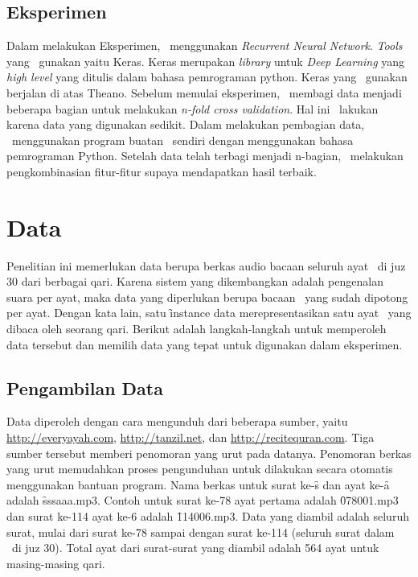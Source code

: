 	\subsection{Eksperimen}
	Dalam melakukan Eksperimen, \saya~menggunakan \textit{Recurrent Neural Network}. \textit{Tools} yang \saya~gunakan yaitu Keras. Keras merupakan \textit{library} untuk \textit{Deep Learning} yang \textit{high level} yang ditulis dalam bahasa pemrograman python. Keras yang \saya~gunakan berjalan di atas Theano.
	Sebelum memulai eksperimen, \saya~membagi data menjadi beberapa bagian untuk melakukan \textit{n-fold cross validation}. Hal ini \saya~lakukan karena data yang digunakan sedikit. Dalam melakukan pembagian data, \saya~menggunakan program buatan \saya~sendiri dengan menggunakan bahasa pemrograman Python.
	Setelah data telah terbagi menjadi n-bagian, \saya~melakukan pengkombinasian fitur-fitur supaya mendapatkan hasil terbaik.
\section{Data}
Penelitian ini memerlukan data berupa berkas audio bacaan seluruh ayat \quran~di juz 30 dari berbagai qari. Karena sistem yang dikembangkan adalah pengenalan suara per ayat, maka data yang diperlukan berupa bacaan \quran~yang sudah dipotong per ayat. Dengan kata lain, satu \f{instance} data merepresentasikan satu ayat \quran~yang dibaca oleh seorang qari. Berikut adalah langkah-langkah untuk memperoleh data tersebut dan memilih data yang tepat untuk digunakan dalam eksperimen.

  \subsection{Pengambilan Data} \label{pengambilan data}
  Data diperoleh dengan cara mengunduh dari beberapa sumber, yaitu \url{http://everyayah.com}, \url{http://tanzil.net}, dan \url{http://recitequran.com}. Tiga sumber tersebut memberi penomoran yang urut pada datanya. Penomoran berkas yang urut memudahkan proses pengunduhan untuk dilakukan secara otomatis menggunakan bantuan program. Nama berkas untuk surat ke-\f{s} dan ayat ke-\f{a} adalah \f{sssaaa.mp3}. Contoh untuk surat ke-78 ayat pertama adalah \f{078001.mp3} dan surat ke-114 ayat ke-6 adalah \f{114006.mp3}. Data yang diambil adalah seluruh surat, mulai dari surat ke-78 sampai dengan surat ke-114 (seluruh surat dalam \quran~di juz 30). Total ayat dari surat-surat yang diambil adalah 564 ayat untuk masing-masing qari.

